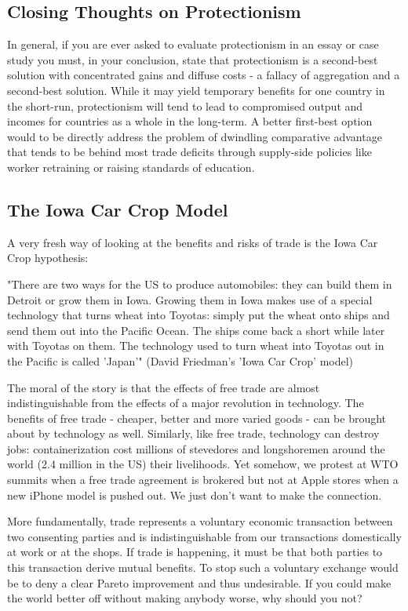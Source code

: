 \subsection{Closing Thoughts on Protectionism}
In general, if you are ever asked to evaluate protectionism in an essay or case study you must, in your conclusion, state that protectionism is a second-best solution with concentrated gains and diffuse costs - a fallacy of aggregation and a second-best solution. While it may yield temporary benefits for one country in the short-run, protectionism will tend to lead to compromised output and incomes for countries as a whole in the long-term. A better first-best option would to be directly address the problem of dwindling comparative advantage that tends to be behind most trade deficits through supply-side policies like worker retraining or raising standards of education.
\subsection{The Iowa Car Crop Model}
A very fresh way of looking at the benefits and risks of trade is the Iowa Car Crop hypothesis:

"There are two ways for the US to produce automobiles: they can build them in Detroit or grow them in Iowa. Growing them in Iowa makes use of a special technology that turns wheat into Toyotas: simply put the wheat onto ships and send them out into the Pacific Ocean. The ships come back a short while later with Toyotas on them. The technology used to turn wheat into Toyotas out in the Pacific is called 'Japan'" (David Friedman's 'Iowa Car Crop' model)

The moral of the story is that the effects of free trade are almost indistinguishable from the effects of a major revolution in technology. The benefits of free trade - cheaper, better and more varied goods - can be brought about by technology as well. Similarly, like free trade, technology can destroy jobs: containerization cost millions of stevedores and longshoremen around the world (2.4 million in the US) their livelihoods. Yet somehow, we protest at WTO summits when a free trade agreement is brokered but not at Apple stores when a new iPhone model is pushed out. We just don't want to make the connection.

More fundamentally, trade represents a voluntary economic transaction between two consenting parties and is indistinguishable from our transactions domestically at work or at the shops. If trade is happening, it must be that both parties to this transaction derive mutual benefits. To stop such a voluntary exchange would be to deny a clear Pareto improvement and thus undesirable. If you could make the world better off without making anybody worse, why should you not?
